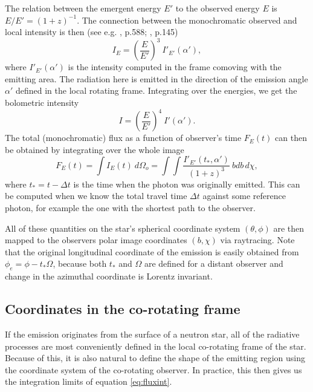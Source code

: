 \documentclass[iop, usenatbib]{emulateapj}
\newcommand{\be}{\begin{equation}}
\newcommand{\ee}{\end{equation}}
\begin{document}
The relation between the emergent energy $E'$ to the observed energy $E$ is $E/E' = (1 + z)^{-1}$.
The connection between the monochromatic observed and local intensity is then (see e.g. \citealt{MTW73}, p.588; \citealt{RL79}, p.145)
\be
I_E = \left( \frac{E}{E'} \right)^3 ~I'_{E'}(\alpha'),
\ee
where $I'_{E'}(\alpha')$ is the intensity computed in the frame comoving with the emitting area.
The radiation here is emitted in the direction of the emission angle $\alpha'$ defined in the local rotating frame.
Integrating over the energies, we get the bolometric intensity
\be
I = \left(\frac{E}{E'} \right)^4 ~I'(\alpha').
\ee
The total (monochromatic) flux as a function of observer's time $F_E(t)$ can then be obtained by integrating over the whole image
\be\label{eq:fluxint}
F_E(t) = \int I_{E}(t) ~d\Omega_o = \int\int \frac{I'_{E'}(t_*, \alpha')}{(1+z)^3}  ~bdb \, d\chi,
\ee
where $t_* = t - \Delta t$ is the time when the photon was originally emitted. 
This can be computed when we know the total travel time $\Delta t$ against some reference photon, for example the one with the shortest path to the observer.

All of these quantities on the star's spherical coordinate system $(\theta, \phi)$ are then mapped to the observers polar image coordinates $(b, \chi)$ via raytracing.
Note that the original longitudinal coordinate of the emission is easily obtained from $\phi_e = \phi - t_* \Omega$, because both $t_*$ and $\Omega$ are defined for a distant observer and change in the azimuthal coordinate is Lorentz invariant.


\subsection{Coordinates in the co-rotating frame}\label{sect:coords}
If the emission originates from the surface of a neutron star, all of the radiative processes are most conveniently defined in the local co-rotating frame of the star.
Because of this, it is also natural to define the shape of the emitting region using the coordinate system of the co-rotating observer.  
In practice, this then gives us the integration limits of equation \eqref{eq:fluxint}.
\end{document}
